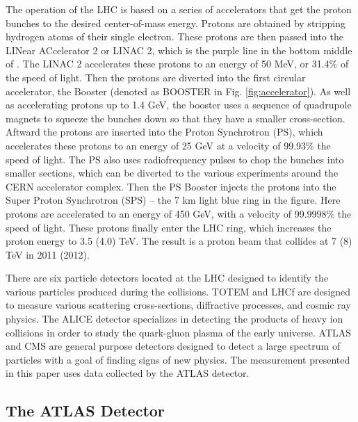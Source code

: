 The operation of the LHC is based on a series of accelerators that get the
proton bunches to the desired center-of-mass energy. Protons are obtained by
stripping hydrogen atoms of their single electron. These protons are then passed into
the LINear ACcelerator 2 or LINAC 2, which is the purple line in the bottom middle
of . The LINAC 2 accelerates these protons to an energy of
50 MeV, or 31.4\% of the speed of light. Then the protons are diverted into the
first circular accelerator, the Booster (denoted as BOOSTER
in Fig. \ref{fig:accelerator}). As well as accelerating protons up to 1.4 GeV,
the booster uses a sequence of quadrupole magnets to squeeze the bunches down 
so that they have a smaller cross-section. Aftward the protons are inserted
into the Proton Synchrotron (PS), which accelerates these protons to an energy
of 25 GeV at a velocity of 99.93\% the speed of light. The PS also uses 
radiofrequency pulses to chop the bunches into smaller sections, which can
be diverted to the various experiments around the CERN accelerator complex.
Then the PS Booster
injects the protons into the Super Proton Synchrotron (SPS) -- the 7 km light blue
ring in the figure. Here protons are accelerated to an energy of 450 GeV,
with a velocity of 99.9998\% the speed of light. These protons finally enter
the LHC ring, which increases the proton energy to 3.5 (4.0) TeV. The result
is a proton beam that collides at 7 (8) TeV in 2011 (2012).

There are six particle detectors located at the LHC designed
to identify the various particles produced during the collisions. TOTEM and LHCf
are designed to measure various scattering cross-sections, diffractive processes, 
and cosmic ray physics. The ALICE detector specializes in detecting the products
of heavy ion collisions in
order to study the quark-gluon plasma of the early universe. ATLAS and CMS 
are general purpose detectors designed to detect a large spectrum of particles
with a goal of finding signs of new physics. The measurement presented in this
paper uses data collected by the ATLAS detector.

\subsection{The ATLAS Detector}
\label{subsec:atlas}

